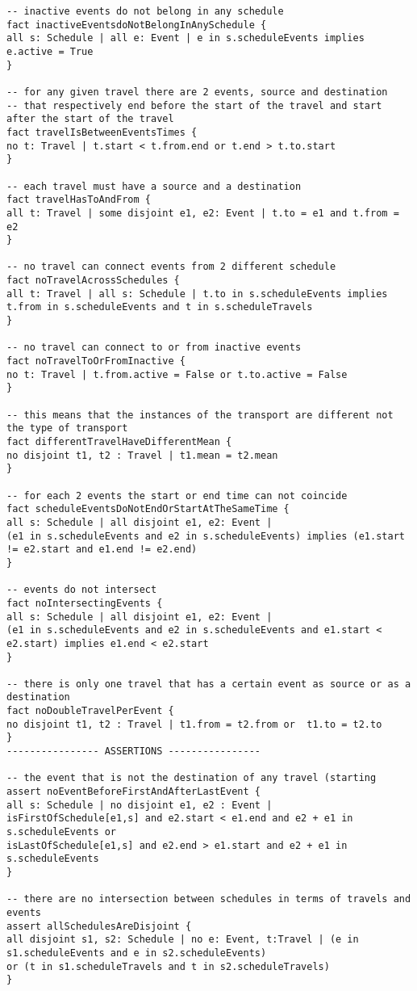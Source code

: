 \begin{lstlisting}[language=alloy]
-- inactive events do not belong in any schedule
fact inactiveEventsdoNotBelongInAnySchedule {
all s: Schedule | all e: Event | e in s.scheduleEvents implies e.active = True
}

-- for any given travel there are 2 events, source and destination
-- that respectively end before the start of the travel and start after the start of the travel
fact travelIsBetweenEventsTimes {
no t: Travel | t.start < t.from.end or t.end > t.to.start
}

-- each travel must have a source and a destination
fact travelHasToAndFrom {
all t: Travel | some disjoint e1, e2: Event | t.to = e1 and t.from = e2
}

-- no travel can connect events from 2 different schedule
fact noTravelAcrossSchedules {
all t: Travel | all s: Schedule | t.to in s.scheduleEvents implies t.from in s.scheduleEvents and t in s.scheduleTravels
}

-- no travel can connect to or from inactive events
fact noTravelToOrFromInactive {
no t: Travel | t.from.active = False or t.to.active = False
}

-- this means that the instances of the transport are different not the type of transport
fact differentTravelHaveDifferentMean {
no disjoint t1, t2 : Travel | t1.mean = t2.mean
}

-- for each 2 events the start or end time can not coincide
fact scheduleEventsDoNotEndOrStartAtTheSameTime {
all s: Schedule | all disjoint e1, e2: Event | 
(e1 in s.scheduleEvents and e2 in s.scheduleEvents) implies (e1.start != e2.start and e1.end != e2.end)
}

-- events do not intersect
fact noIntersectingEvents {
all s: Schedule | all disjoint e1, e2: Event | 
(e1 in s.scheduleEvents and e2 in s.scheduleEvents and e1.start < e2.start) implies e1.end < e2.start
}

-- there is only one travel that has a certain event as source or as a destination
fact noDoubleTravelPerEvent {
no disjoint t1, t2 : Travel | t1.from = t2.from or  t1.to = t2.to
}
---------------- ASSERTIONS ----------------

-- the event that is not the destination of any travel (starting
assert noEventBeforeFirstAndAfterLastEvent {
all s: Schedule | no disjoint e1, e2 : Event | 
isFirstOfSchedule[e1,s] and e2.start < e1.end and e2 + e1 in s.scheduleEvents or
isLastOfSchedule[e1,s] and e2.end > e1.start and e2 + e1 in s.scheduleEvents
}

-- there are no intersection between schedules in terms of travels and events
assert allSchedulesAreDisjoint {
all disjoint s1, s2: Schedule | no e: Event, t:Travel | (e in s1.scheduleEvents and e in s2.scheduleEvents) 
or (t in s1.scheduleTravels and t in s2.scheduleTravels)
}


\end{lstlisting}
